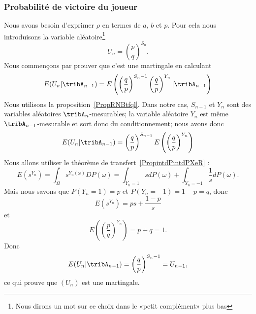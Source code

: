 \subsubsection{Probabilité de victoire du joueur}

Nous avons besoin d'exprimer \( \rho\) en termes de \( a\), \( b\) et \( p\). Pour cela nous introduisons la variable aléatoire\footnote{Nous dirons un mot sur ce choix dans le «petit complément» plus bas}
\begin{equation}    \label{EqFUsSnit}
    U_n=\left( \frac{ p }{ q } \right)^{S_n}.
\end{equation}
Nous commençons par prouver que c'est une martingale en calculant
\begin{equation}
    E(U_n|\tribA_{n-1})=E\left( \left( \frac{ q }{ p } \right)^{S_n-1}\left( \frac{ q }{ p } \right)^{Y_n}|\tribA_{n-1} \right)
\end{equation}
Nous utilisons la proposition~\ref{PropRNBtfql}. Dans notre cas, \( S_{n-1}\) et \( Y_n\) sont des variables aléatoires \( \tribA_n\)-mesurables; la variable aléatoire \( Y_n\) est même \( \tribA_{n-1}\)-mesurable et sort donc du conditionnement; nous avons donc
\begin{equation}    \label{EqWTkXcEK}
    E(U_n|\tribA_{n-1})=\left( \frac{ q }{ p } \right)^{S_{n-1}}E\left( \left( \frac{ q }{ p } \right)^{Y_n} \right)
\end{equation}
Nous allons utiliser le théorème de transfert~\ref{PropintdPintdPXeR} :
\begin{equation}
    E(s^{Y_n})=\int_{\Omega}s^{Y_n(\omega)}DP(\omega)=\int_{Y_n=1}sdP(\omega)+\int_{Y_n=-1}\frac{1}{ s }dP(\omega).
\end{equation}
Mais nous savons que \( P(Y_n=1)=p\) et \( P(Y_n=-1)=1-p=q\), donc
\begin{equation}
    E(s^{Y_n})=ps+\frac{ 1-p }{ s }
\end{equation}
et
\begin{equation}
    E\left( \left( \frac{ p }{ q } \right)^{Y_n} \right)=p+q=1.
\end{equation}
Donc
\begin{equation}
    E(U_n|\tribA_{n-1})=\left( \frac{ q }{ p } \right)^{S_n-1}=U_{n-1},
\end{equation}
ce qui prouve que \( (U_n)\) est une martingale.

